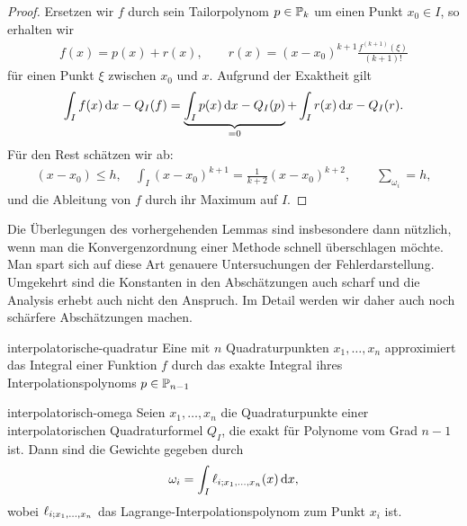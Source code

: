 \begin{proof}
  Ersetzen wir $f$ durch sein Tailorpolynom $p\in \P_k$ um einen Punkt $x_0\in I$, so erhalten wir
  \begin{gather}
    f(x) = p(x) + r(x),
    \qquad r(x) = (x-x_0)^{k+1}\frac{f^{(k+1)}(\xi)}{(k+1)!}
  \end{gather}
  für einen Punkt $\xi$ zwischen $x_0$ und $x$. Aufgrund der Exaktheit gilt
  \begin{gather}
    \int_{I} f(x)\dx - Q_{I}(f)
    = \underbrace{\int_{I} p(x)\dx - Q_{I}(p)}_{=0}
    + \int_{I} r(x) \dx - Q_{I}(r).
  \end{gather}
  Für den Rest schätzen wir ab:
  \begin{gather}
    (x-x_0) \le h,\quad \int_{I}(x-x_0)^{k+1} = \frac1{k+2} (x-x_0)^{k+2},
    \qquad \sum_{\omega_i} = h,
  \end{gather}
  und die Ableitung von $f$ durch ihr Maximum auf $I$.
\end{proof}

\begin{remark}
  Die Überlegungen des vorhergehenden Lemmas sind insbesondere dann
  nützlich, wenn man die Konvergenzordnung einer Methode schnell
  überschlagen möchte. Man spart sich auf diese Art genauere
  Untersuchungen der Fehlerdarstellung. Umgekehrt sind die Konstanten
  in den Abschätzungen auch scharf und die Analysis erhebt auch nicht
  den Anspruch. Im Detail werden wir daher auch noch schärfere
  Abschätzungen machen.
\end{remark}

\begin{Definition}{interpolatorische-quadratur}
  Eine  mit $n$
  Quadraturpunkten $x_1,\dots,x_n$ approximiert das Integral einer
  Funktion $f$ durch das exakte Integral ihres Interpolationspolynoms
  $p\in \P_{n-1}$
\end{Definition}

\begin{Lemma}{interpolatorisch-omega}
  Seien $x_1,\dots,x_n$ die Quadraturpunkte einer interpolatorischen
  Quadraturformel $Q_I$, die exakt für Polynome vom Grad $n-1$
  ist. Dann sind die Gewichte gegeben durch
  \begin{gather}
    \omega_i = \int_I \plagrange_{i;x_1,\dots,x_n}(x)\dx,
  \end{gather}
  wobei $\plagrange_{i;x_1,\dots,x_n}$ das
  Lagrange-Interpolationspolynom zum Punkt $x_i$ ist.
\end{Lemma}

